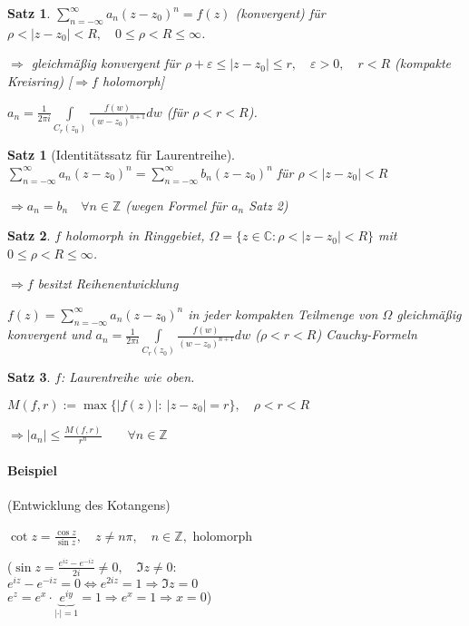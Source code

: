 \documentclass[ngerman,halfparskip]{scrartcl}
\newtheorem*{satz}{Satz}
\newtheorem*{satz*}{Satz}
\theoremstyle{definition}
\def\C{\mathbb C}
\def\Z{\mathbb Z}
\begin{document}
\begin{satz}
$\sum\limits_{n=-\infty}^\infty a_{n}{(z-z_0)^n}=f(z)$ (konvergent) für $\rho < |z-z_0|<R, \quad 0\leq \rho<R\leq\infty$.

$\Rightarrow$ gleichmäßig konvergent für $\rho+\varepsilon\leq|z-z_0|\leq r, \quad \varepsilon>0, \quad r<R$ (kompakte Kreisring) [$\Rightarrow f$ holomorph]

$a_n=\frac 1 {2\pi i} \int\limits_{C_r(z_0)}\frac {f(w)}{(w-z_0)^{n+1}}dw$ (für $\rho<r<R$).
\end{satz}

\begin{satz*}[Identitätssatz für Laurentreihe] $\sum\limits_{n=-\infty}^\infty a_{n}{(z-z_0)^n}=\sum\limits_{n=-\infty}^\infty b_{n}{(z-z_0)^n}$ für $\rho<|z-z_0|<R$

$\Rightarrow a_n=b_n \quad \forall n\in\Z$ (wegen Formel für $a_n$ Satz 2)

\end{satz*}

\begin{satz}
$f$ holomorph in Ringgebiet, $\Omega=\{z\in\C:\rho<|z-z_0|<R\}$ mit $0\leq\rho<R\leq\infty$.

$\Rightarrow f$ besitzt Reihenentwicklung

$f(z)=\sum\limits_{n=-\infty}^\infty a_{n}{(z-z_0)^n}$ in jeder kompakten Teilmenge von $\Omega$ gleichmäßig konvergent und $a_n=\frac 1 {2\pi i} \int\limits_{C_r(z_0)}\frac {f(w)}{(w-z_0)^{n+1}}dw$ ($\rho<r<R$) Cauchy-Formeln
\end{satz}

\begin{satz}
$f$: Laurentreihe wie oben. 

$M(f,r):=\max \{|f(z)|: ~|z-z_0|=r\}, \quad \rho<r<R$

$\Rightarrow |a_n|\leq \frac {M(f,r)}{r^n} \qquad \forall n\in\Z$

\end{satz} 


\paragraph{Beispiel} (Entwicklung des Kotangens) 

$\cot z=\frac {\cos z}{\sin z}, \quad z\neq n\pi, \quad n\in\Z,$ holomorph

($\sin z=\frac{e^{iz}-e^{-iz}}{2i}\neq 0,\quad \Im z\neq 0:$\\
$e^{iz}-e^{-iz}=0 \Leftrightarrow e^{2iz}=1 \Rightarrow \Im z=0$\\
$e^z=e^x\cdot \underbrace {e^{iy}}_{|\cdot|=1}=1 \Rightarrow e^x=1 \Rightarrow x=0$)
\end{document}
